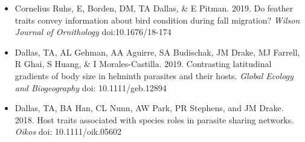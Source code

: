 \documentclass[]{CV}
\begin{document}
\begin{itemize}
  \item Cornelius Ruhs, E, Borden, DM, {\mefont TA Dallas}, \& E Pitman. 2019. Do feather traits convey information about bird condition during fall migration? \textit{Wilson Journal of Ornithology} doi:10.1676/18-174

  \item {\mefont Dallas, TA}, AL Gehman, AA Aguirre, SA Budischak, JM Drake, MJ Farrell, R Ghai, S Huang, \& I Morales-Castilla. 2019. Contrasting latitudinal gradients of body size in helminth parasites and their hosts. \textit{Global Ecology and Biogeography} doi: 10.1111/geb.12894

\item {\mefont Dallas, TA}, BA Han, CL Nunn, AW Park, PR Stephens, and JM Drake. 2018. Host traits associated with species roles in parasite sharing networks. \textit{Oikos} doi: 10.1111/oik.05602
 
\end{itemize}
\end{document}
